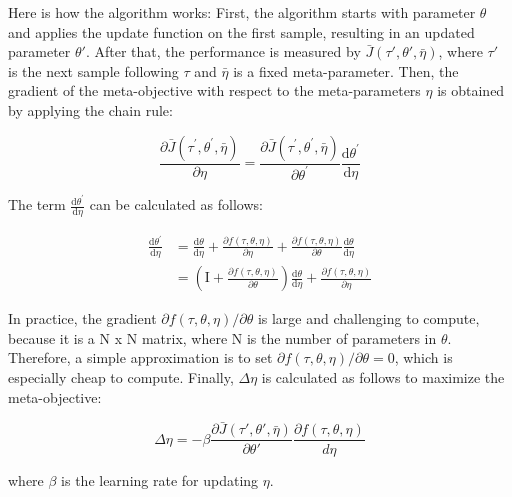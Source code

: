 \par
Here is how the algorithm works: First, the algorithm starts with parameter $\theta$ and applies the update function on the first sample, resulting in an updated parameter $\theta'$. After that, the performance is measured by $\bar{J}(\tau', \theta', \bar{\eta})$, where $\tau'$ is the next sample following $\tau$ and $\bar{\eta}$ is a fixed meta-parameter. Then, the gradient of the meta-objective with respect to the meta-parameters $\eta$ is obtained by applying the chain rule:

\[\frac{\partial \bar{J}\left(\tau^{\prime}, \theta^{\prime}, \bar{\eta}\right)}{\partial \eta}=\frac{\partial \bar{J}\left(\tau^{\prime}, \theta^{\prime}, \bar{\eta}\right)}{\partial \theta^{\prime}} \frac{\mathrm{d} \theta^{\prime}}{\mathrm{d} \eta}\]

The term $\frac{\mathrm{d} \theta^{\prime}}{\mathrm{d} \eta}$ can be calculated as follows:

\begin{align*}
	\frac{\mathrm{d} \theta^{\prime}}{\mathrm{d} \eta}&=\frac{\mathrm{d} \theta}{\mathrm{d} \eta}+\frac{\partial f(\tau, \theta, \eta)}{\partial \eta}+\frac{\partial f(\tau, \theta, \eta)}{\partial \theta} \frac{\mathrm{d} \theta}{\mathrm{d} \eta} \\
	&=\left(\mathrm{I}+\frac{\partial f(\tau, \theta, \eta)}{\partial \theta}\right) \frac{\mathrm{d} \theta}{\mathrm{d} \eta}+\frac{\partial f(\tau, \theta, \eta)}{\partial \eta}
\end{align*}

In practice, the gradient $\partial f(\tau, \theta, \eta) / \partial \theta$ is large and challenging to compute, because it is a N x N matrix, where N is the number of parameters in $\theta$. Therefore, a simple approximation is to set $\partial f(\tau, \theta, \eta) / \partial \theta=0$, which is especially cheap to compute. Finally, $\Delta\eta$ is calculated as follows to maximize the meta-objective:

\[\Delta \eta = -\beta \frac{\partial \bar{J}(\tau', \theta', \bar{\eta})}{\partial \theta'} \frac{\partial f(\tau, \theta, \eta)}{d\eta}\]

where $\beta$ is the learning rate for updating $\eta$.

